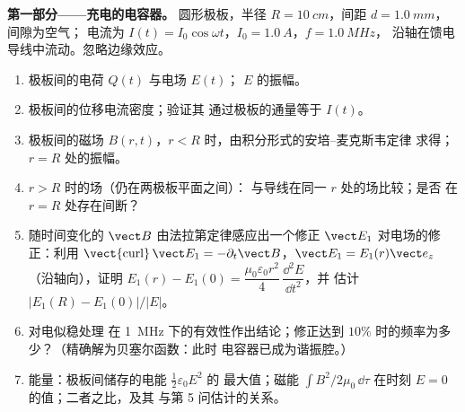 \begin{problem}
\label{pb:b2:maxwell-equations:1}

\medskip
\noindent\textbf{第一部分——充电的电容器。}
圆形极板，半径 $R = \qty{10}{cm}$，间距 $d = \qty{1.0}{mm}$，间隙为空气；
电流为 $I(t) = I_0\cos\omega t$，$I_0 = \qty{1.0}{A}$，$f = \qty{1.0}{MHz}$，
沿轴在馈电导线中流动。忽略边缘效应。
\begin{enumerate}
  \item 极板间的电荷 $Q(t)$ 与电场 $E(t)$；
        $E$ 的振幅。
  \item 极板间的位移电流密度；验证其
        通过极板的通量等于 $I(t)$。
  \item 极板间的磁场 $B(r, t)$，$r < R$ 时，由积分形式的安培–麦克斯韦定律
        求得；$r = R$ 处的振幅。
  \item $r > R$ 时的场（仍在两极板平面之间）：
        与导线在同一 $r$ 处的场比较；是否
        在 $r = R$ 处存在间断？
  \item 随时间变化的 $\vect B$ 由法拉第定律感应出一个修正
        $\vect E_1$ 对电场的修正：利用 $\operatorname{\vect{curl}}\vect E_1
        = -\partial_t\vect B$，$\vect E_1 = E_1(r)\vect e_z$（沿轴向），证明
        $E_1(r) - E_1(0) = \dfrac{\mu_0\varepsilon_0r^2}4\,\dfrac{\dd^2E}{\dd t^2}$，并
        估计 $|E_1(R) - E_1(0)|/|E|$。
  \item 对电似稳处理
        在 \qty{1}{MHz} 下的有效性作出结论；修正达到
        $10\%$ 时的频率为多少？（精确解为贝塞尔函数：此时
        电容器已成为谐振腔。）
  \item 能量：极板间储存的电能 $\tfrac12\varepsilon_0E^2$ 的
        最大值；磁能 $\int B^2/2\mu_0\,\dd\tau$
        在时刻 $E = 0$ 的值；二者之比，及其
        与第 5 问估计的关系。
\end{enumerate}


\end{problem}
